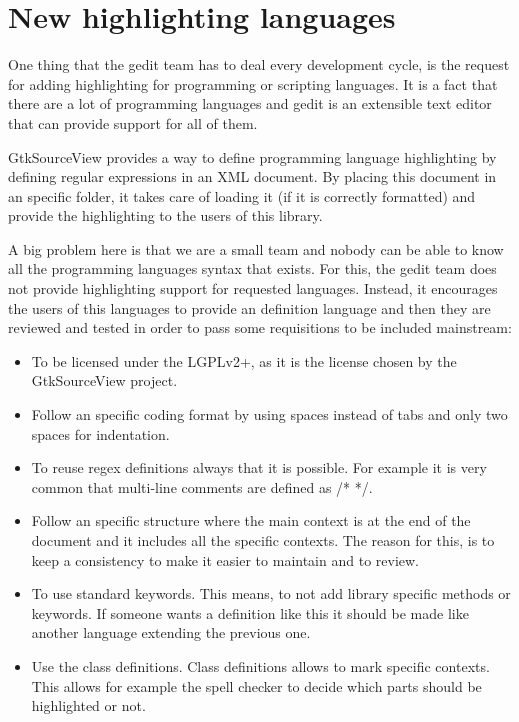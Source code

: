 
\chapter{New highlighting languages}

One thing that the gedit team has to deal every development cycle, is the request for adding highlighting for programming or scripting languages. It is a fact that there are a lot of programming languages and gedit is an extensible text editor that can provide support for all of them.

GtkSourceView provides a way to define programming language highlighting by defining regular expressions in an XML document. By placing this document in an specific folder, it takes care of loading it (if it is correctly formatted) and provide the highlighting to the users of this library.

A big problem here is that we are a small team and nobody can be able to know all the programming languages syntax that exists. For this, the gedit team does not provide highlighting support for requested languages. Instead, it encourages the users of this languages to provide an definition language and then they are reviewed and tested in order to pass some requisitions to be included mainstream:
\begin{itemize}
  \item To be licensed under the LGPLv2+, as it is the license chosen by the GtkSourceView project.
  \item Follow an specific coding format by using spaces instead of tabs and only two spaces for indentation.
  \item To reuse regex definitions always that it is possible. For example it is very common that multi-line comments are defined as /* */.
  \item Follow an specific structure where the main context is at the end of the document and it includes all the specific contexts. The reason for this, is to keep a consistency to make it easier to maintain and to review.
  \item To use standard keywords. This means, to not add library specific methods or keywords. If someone wants a definition like this it should be made like another language extending the previous one.
  \item Use the class definitions. Class definitions allows to mark specific contexts. This allows for example the spell checker to decide which parts should be highlighted or not.
\end{itemize}


